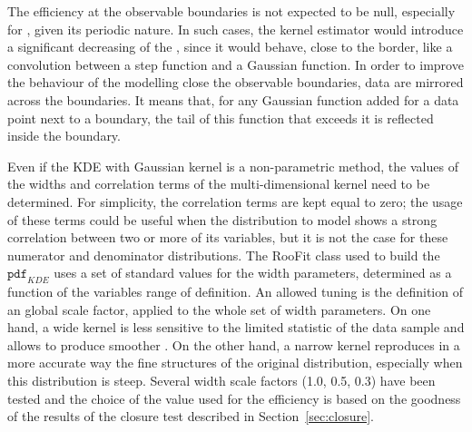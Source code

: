 The efficiency at the observable boundaries is not expected to be null, especially for \PHI, given its periodic nature. 
In such cases, the kernel estimator would introduce a significant decreasing of the \pdf, since it would behave, close to the border, like a convolution between a step function and a Gaussian function.
In order to improve the behaviour of the modelling close the observable boundaries, data are mirrored across the boundaries.
It means that, for any Gaussian function added for a data point next to a boundary, the tail of this function that exceeds it is reflected inside the boundary.

Even if the KDE with Gaussian kernel is a non-parametric method, the values of the widths and correlation terms of the multi-dimensional kernel need to be determined.
For simplicity, the correlation terms are kept equal to zero; the usage of these terms could be useful when the distribution to model shows a strong correlation between two or more of its variables, but it is not the case for these numerator and denominator distributions.
The {\sc RooFit} class used to build the $\mathtt{pdf}_{KDE}$ uses a set of standard values for the width parameters, determined as a function of the variables range of definition.
An allowed tuning is the definition of an global scale factor, applied to the whole set of width parameters.
On one hand, a wide kernel is less sensitive to the limited statistic of the data sample and allows to produce smoother \pdfs.
On the other hand, a narrow kernel reproduces in a more accurate way the fine structures of the original distribution, especially when this distribution is steep.
Several width scale factors (1.0, 0.5, 0.3) have been tested and the choice of the value used for the efficiency is based on the goodness of the results of the closure test described in Section~\ref{sec:closure}.


